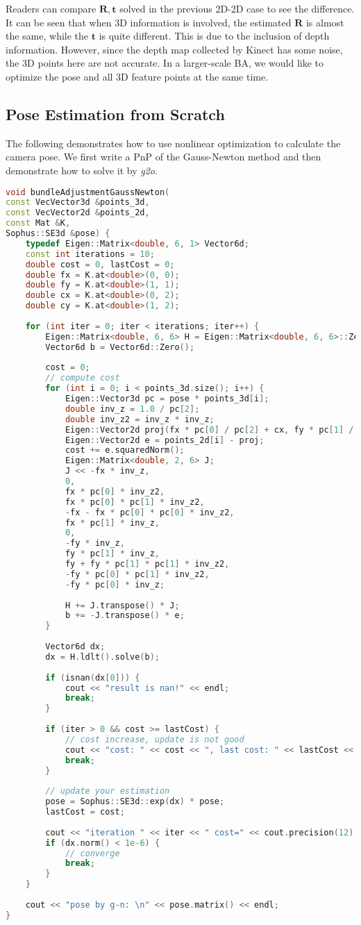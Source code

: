 Readers can compare $\mathbf{R},\mathbf{t}$ solved in the previous 2D-2D case to see the difference. It can be seen that when 3D information is involved, the estimated $\mathbf{R}$ is almost the same, while the $\mathbf{t}$ is quite different. This is due to the inclusion of depth information. However, since the depth map collected by Kinect has some noise, the 3D points here are not accurate. In a larger-scale BA, we would like to optimize the pose and all 3D feature points at the same time.


\subsection{Pose Estimation from Scratch}
The following demonstrates how to use nonlinear optimization to calculate the camera pose. We first write a PnP of the Gauss-Newton method and then demonstrate how to solve it by \textit{g2o}.
\begin{lstlisting}[language=c++,caption=slambook2/ch7/pose_estimation_3d2d.cpp (part)]
void bundleAdjustmentGaussNewton(
const VecVector3d &points_3d,
const VecVector2d &points_2d,
const Mat &K,
Sophus::SE3d &pose) {
	typedef Eigen::Matrix<double, 6, 1> Vector6d;
	const int iterations = 10;
	double cost = 0, lastCost = 0;
	double fx = K.at<double>(0, 0);
	double fy = K.at<double>(1, 1);
	double cx = K.at<double>(0, 2);
	double cy = K.at<double>(1, 2);
	
	for (int iter = 0; iter < iterations; iter++) {
		Eigen::Matrix<double, 6, 6> H = Eigen::Matrix<double, 6, 6>::Zero();
		Vector6d b = Vector6d::Zero();
		
		cost = 0;
		// compute cost
		for (int i = 0; i < points_3d.size(); i++) {
			Eigen::Vector3d pc = pose * points_3d[i];
			double inv_z = 1.0 / pc[2];
			double inv_z2 = inv_z * inv_z;
			Eigen::Vector2d proj(fx * pc[0] / pc[2] + cx, fy * pc[1] / pc[2] + cy);
			Eigen::Vector2d e = points_2d[i] - proj;
			cost += e.squaredNorm();
			Eigen::Matrix<double, 2, 6> J;
			J << -fx * inv_z,
			0,
			fx * pc[0] * inv_z2,
			fx * pc[0] * pc[1] * inv_z2,
			-fx - fx * pc[0] * pc[0] * inv_z2,
			fx * pc[1] * inv_z,
			0,
			-fy * inv_z,
			fy * pc[1] * inv_z,
			fy + fy * pc[1] * pc[1] * inv_z2,
			-fy * pc[0] * pc[1] * inv_z2,
			-fy * pc[0] * inv_z;
			
			H += J.transpose() * J;
			b += -J.transpose() * e;
		}
		
		Vector6d dx;
		dx = H.ldlt().solve(b);
		
		if (isnan(dx[0])) {
			cout << "result is nan!" << endl;
			break;
		}
		
		if (iter > 0 && cost >= lastCost) {
			// cost increase, update is not good
			cout << "cost: " << cost << ", last cost: " << lastCost << endl;
			break;
		}
		
		// update your estimation
		pose = Sophus::SE3d::exp(dx) * pose;
		lastCost = cost;
		
		cout << "iteration " << iter << " cost=" << cout.precision(12) << cost << endl;
		if (dx.norm() < 1e-6) {
			// converge
			break;
		}
	}
	
	cout << "pose by g-n: \n" << pose.matrix() << endl;
}
\end{lstlisting}

